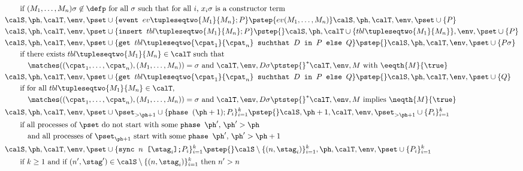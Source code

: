 \documentclass{book}
\begin{document}
\begin{figure}
\begin{align*}
&\qquad\text{if $(M_1,\ldots,M_n)\sigma \not\in \defp$ for all $\sigma$ such that for all $i$, $x_i\sigma$ is a constructor term}\\
&\calS, \ph, \calT, \env, \pset \cup \{ \texttt{event } ev\tupleseqtwo{M_1}{M_n}; P\} \pstep{ev(M_1,\ldots,M_n)} \calS, \ph, \calT, \env, \pset \cup \{ P \}\\
&\calS, \ph, \calT, \env, \pset \cup \{ \texttt{insert } tbl\tupleseqtwo{M_1}{M_n}; P \} \pstep{} \calS, \ph, \calT \cup \{ tbl\tupleseqtwo{M_1}{M_n} \}, \env, \pset \cup \{ P \}\\
&\calS, \ph, \calT, \env, \pset \cup \{ \texttt{get } tbl\tupleseqtwo{\cpat_1}{\cpat_n} \texttt{ suchthat } D \texttt{ in } P \texttt{ else } Q\} \pstep{} \calS, \ph, \calT, \env, \pset \cup \{ P\sigma \}\\
&\qquad\text{if there exists $tbl\tupleseqtwo{M_1}{M_n} \in \calT$ such that}\\
&\qquad\quad\text{$\matches((\cpat_1,\ldots,\cpat_n),(M_1,\ldots,M_n)) = \sigma$ and $\calT,\env,D\sigma \ptstep{}^* \calT,\env,M$ with $\eeqth{M}{\true}$}\\
&\calS, \ph, \calT, \env, \pset \cup \{ \texttt{get } tbl\tupleseqtwo{\cpat_1}{\cpat_n} \texttt{ suchthat } D \texttt{ in } P \texttt{ else } Q \} \pstep{} \calS, \ph, \calT, \env, \pset \cup \{ Q \}\\
&\qquad\text{if for all $tbl\tupleseqtwo{M_1}{M_n} \in \calT$,}\\
&\qquad\quad\text{$\matches((\cpat_1,\ldots,\cpat_n),(M_1,\ldots,M_n)) = \sigma$ and $\calT,\env,D\sigma \ptstep{}^* \calT,\env,M$ implies $\neqth{M}{\true}$}\\
&\calS, \ph, \calT, \env, \pset \cup \pset_{>\ph+1} \cup \{ \texttt{phase } (\ph+1);P_i \}_{i=1}^k \pstep{} \calS, \ph+1, \calT, \env, \pset_{>\ph+1} \cup \{ P_i \}_{i=1}^k\\
&\qquad\text{if all processes of $\pset$ do not start with some $\texttt{phase } \ph'$, $\ph' > \ph$}\\
&\qquad\quad\text{and all processes of $\pset_{\ph+1}$ start with some $\texttt{phase } \ph'$, $\ph' > \ph+1$}\\
&\calS, \ph, \calT, \env, \pset \cup \{ \texttt{sync } n\texttt{ [}\stag_i\texttt{];}P_i \}_{i=1}^k \pstep{} \calS \setminus \{ (n, \stag_i) \}_{i=1}^k, \ph, \calT, \env, \pset \cup \{ P_i \}_{i=1}^k\\
&\qquad\text{if $k \geq 1$ and if $(n', \stag') \in \calS \setminus \{ (n, \stag_i) \}_{i=1}^k$ then $n'>n$}\\

\end{align*}
\end{figure}
\end{document}
